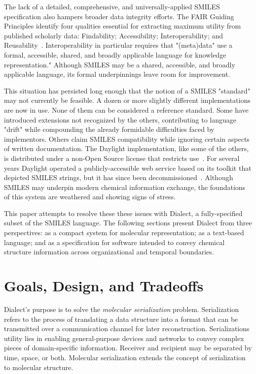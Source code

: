 \documentclass{article}
\begin{document}
The lack of a detailed, comprehensive, and universally-applied SMILES specification also hampers broader data integrity efforts. The FAIR Guiding Principles identify four qualities essential for extracting maximum utility from published scholarly data: Findability; Accessibility; Interoperability; and Reusability~\cite{wilkinson:2016}. Interoperability in particular requires that "(meta)data" use a formal, accessible, shared, and broadly applicable language for knowledge representation." Although SMILES may be a shared, accessible, and broadly applicable language, its formal underpinnings leave room for improvement.

This situation has persisted long enough that the notion of a SMILES "standard" may not currently be feasible. A dozen or more slightly different implementations are now in use. None of them can be considered a reference standard. Some have introduced extensions not recognized by the others, contributing to language "drift" while compounding the already formidable difficulties faced by implementors. Others claim SMILES compatibility while ignoring certain aspects of written documentation. The Daylight implementation, like some of the others, is distributed under a non-Open Source license that restricts use~\cite{daylightToolkit}. For several years Daylight operated a publicly-accessible web service based on its toolkit that depicted SMILES strings, but it has since been decommissioned~\cite{depictArchive}. Although SMILES may underpin modern chemical information exchange, the foundations of this system are weathered and showing signs of stress.

This paper attempts to resolve these these issues with Dialect, a fully-specified subset of the SMILES language. The following sections present Dialect from three perspectives: as a compact system for molecular representation; as a text-based language; and as a specification for software intended to convey chemical structure information across organizational and temporal boundaries.

\section*{Goals, Design, and Tradeoffs}

Dialect's purpose is to solve the \textit{molecular serialization} problem. Serialization refers to the process of translating a data structure into a format that can be transmitted over a communication channel for later reconstruction. Serializations utility lies in enabling general-purpose devices and networks to convey complex pieces of domain-specific information. Receiver and recipient may be separated by time, space, or both. Molecular serialization extends the concept of serialization to molecular structure.
\end{document}
